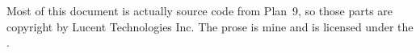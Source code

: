 Most of this document is actually source code from Plan~9, so
those parts are copyright by Lucent Technologies Inc.
The prose is mine and is licensed under the \license.
